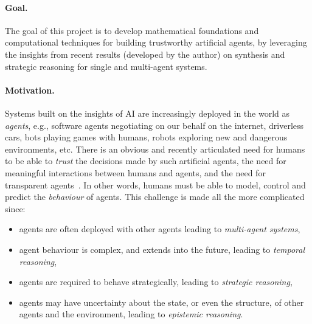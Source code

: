 \documentclass[a4paper,12pt,smallheadings]{scrartcl}
\begin{document}


\paragraph{Goal.} The goal of this project is to develop mathematical foundations and computational techniques for building trustworthy artificial agents, by leveraging the insights from  
recent results (developed by the author) on synthesis and strategic reasoning for single and multi-agent systems.


\paragraph{Motivation.} Systems built on the insights of AI are increasingly deployed in the world as \emph{agents}, 
e.g., software agents negotiating on our behalf on the internet, driverless cars, bots playing games with humans, 
robots exploring new and dangerous environments, etc. There is an obvious and recently articulated need for humans to 
be able to \emph{trust} the decisions made by such artificial agents, 
the need for {meaningful interactions} between humans and agents, and the need for {transparent} agents~\cite{ACMStatement07}. 
In other words, humans must be able to model, control and predict the \emph{behaviour} of agents. This challenge is made 
all the more complicated since:
\begin{itemize} 
 \item agents are often deployed with other agents leading to \emph{multi-agent systems},
 \item agent behaviour is complex, and extends into the future, leading to \emph{temporal reasoning},
 \item agents are required to behave strategically, leading to \emph{strategic reasoning},
 \item agents may have uncertainty about the state, or even the structure, of other agents and the environment, leading to \emph{epistemic reasoning}.
\end{itemize}
\end{document}
